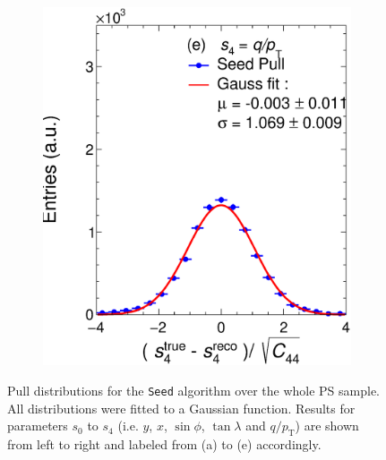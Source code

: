 \begin{figure}[!ht]
\begin{subfigure}{0.32\textwidth}
         \includegraphics[width=\textwidth]{figures/ch4-KF_NDGArLite/MC/ALICE+KF/UnitSeed_p4.eps}
         \caption{}
         \label{fig:resp4SeedGAr}
     \end{subfigure}
        \caption{Pull distributions for the \texttt{Seed} algorithm over the whole PS sample. All distributions were fitted to a Gaussian function. Results for parameters $s_0$ to $s_4$ (i.e. $y$, $x$, $\sin\phi$, $\tan\lambda$ and $q/p_{\text{T}}$) are shown from left to right and labeled from (a) to (e) accordingly. }
        \label{fig:UnitGAr}
\end{figure}

